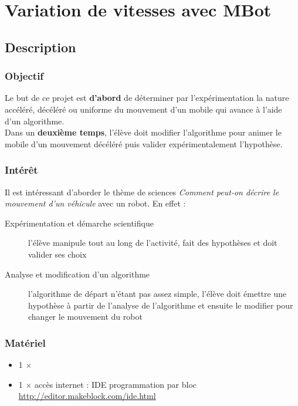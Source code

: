 \section{Variation de vitesses avec MBot}



\subsection{Description}

\subsubsection{Objectif}


\begin{formule}
Le but de ce projet est \textbf{d'abord} de déterminer par l'expérimentation la nature accéléré, décéléré ou uniforme du mouvement d'un mobile qui avance à l'aide d'un algorithme.\\
Dans un \textbf{deuxième temps}, l'élève doit modifier l'algorithme pour animer le mobile d'un mouvement décéléré puis valider expérimentalement l'hypothèse.
\end{formule}


\subsubsection{Intérêt}

Il est intéressant d'aborder le thème de sciences \textit{Comment peut-on décrire le mouvement d'un véhicule } avec un robot. En effet :

\begin{description}
    \item [Expérimentation et démarche scientifique] l'élève manipule tout au long de l'activité, fait des hypothèses et doit valider ses choix
    \item [Analyse et modification d'un algorithme] l'algorithme de départ n'étant pas assez simple, l'élève doit émettre une hypothèse à partir de l'analyse de l'algorithme et ensuite le modifier pour changer le mouvement du robot
\end{description}


\subsubsection{Matériel}
\begin{itemize}

   
    \item 1 $\times$ \matosMbot
   \item 1 $\times$ accès internet : IDE programmation par bloc \url{http://editor.makeblock.com/ide.html}
\end{itemize}

